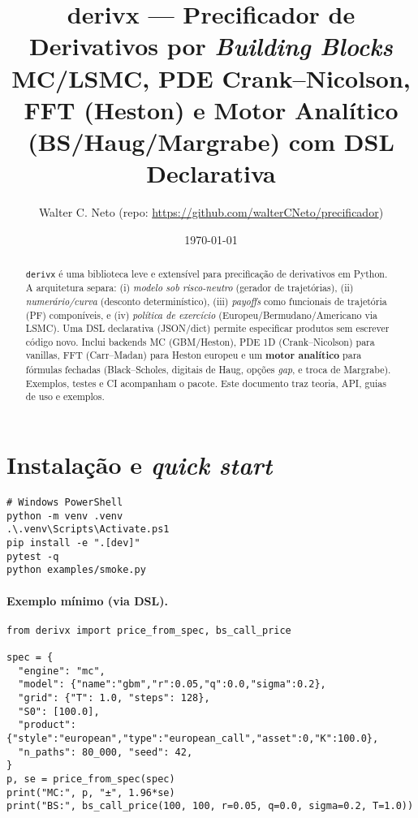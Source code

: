 ﻿\documentclass[11pt,a4paper]{article}
\title{\textbf{derivx} --- Precificador de Derivativos por \emph{Building Blocks}\\
\large MC/LSMC, PDE Crank--Nicolson, FFT (Heston) e Motor Analítico (BS/Haug/Margrabe) com DSL Declarativa}
\author{Walter C. Neto (repo: \url{https://github.com/walterCNeto/precificador})}
\date{\today}
\begin{document}
\maketitle

\begin{abstract}
\texttt{derivx} é uma biblioteca leve e extensível para precificação de derivativos em Python.
A arquitetura separa: (i) \emph{modelo sob risco-neutro} (gerador de trajetórias),
(ii) \emph{numerário/curva} (desconto determinístico), (iii) \emph{payoffs} como funcionais de trajetória (PF) componíveis,
e (iv) \emph{política de exercício} (Europeu/Bermudano/Americano via LSMC).
Uma DSL declarativa (JSON/dict) permite especificar produtos sem escrever código novo.
Inclui backends MC (GBM/Heston), PDE 1D (Crank--Nicolson) para vanillas, FFT (Carr--Madan) para Heston europeu
e um \textbf{motor analítico} para fórmulas fechadas (Black--Scholes, digitais de Haug, opções \emph{gap}, e troca de Margrabe).
Exemplos, testes e CI acompanham o pacote. Este documento traz teoria, API, guias de uso e exemplos.
\end{abstract}

\tableofcontents

\section{Instalação e \emph{quick start}}
\begin{verbatim}
# Windows PowerShell
python -m venv .venv
.\.venv\Scripts\Activate.ps1
pip install -e ".[dev]"
pytest -q
python examples/smoke.py
\end{verbatim}

\paragraph{Exemplo mínimo (via DSL).}
\begin{lstlisting}[style=pystyle]
from derivx import price_from_spec, bs_call_price

spec = {
  "engine": "mc",
  "model": {"name":"gbm","r":0.05,"q":0.0,"sigma":0.2},
  "grid": {"T": 1.0, "steps": 128},
  "S0": [100.0],
  "product": {"style":"european","type":"european_call","asset":0,"K":100.0},
  "n_paths": 80_000, "seed": 42,
}
p, se = price_from_spec(spec)
print("MC:", p, "±", 1.96*se)
print("BS:", bs_call_price(100, 100, r=0.05, q=0.0, sigma=0.2, T=1.0))
\end{lstlisting}
\end{document}

